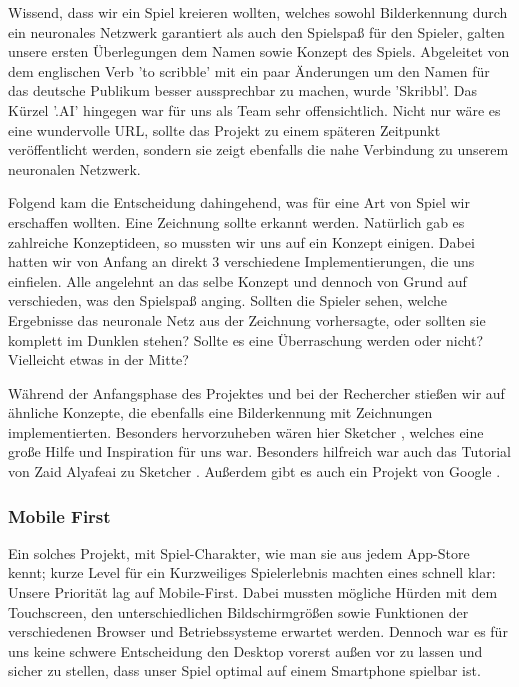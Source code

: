 \documentclass[11pt]{article}
\begin{document}
Wissend, dass wir ein Spiel kreieren wollten, welches sowohl Bilderkennung durch ein neuronales Netzwerk garantiert als auch den Spielspaß für den Spieler, galten unsere ersten Überlegungen dem Namen sowie Konzept des Spiels.
Abgeleitet von dem englischen Verb 'to scribble' mit ein paar Änderungen um den Namen für das deutsche Publikum besser aussprechbar zu machen, wurde 'Skribbl'. Das Kürzel '.AI' hingegen war für uns als Team sehr offensichtlich. Nicht nur wäre es eine wundervolle URL, sollte das Projekt zu einem späteren Zeitpunkt veröffentlicht werden, sondern sie zeigt ebenfalls die nahe Verbindung zu unserem neuronalen Netzwerk.

Folgend kam die Entscheidung dahingehend, was für eine Art von Spiel wir erschaffen wollten. Eine Zeichnung sollte erkannt werden. Natürlich gab es zahlreiche Konzeptideen, so mussten wir uns auf ein Konzept einigen. Dabei hatten wir von Anfang an direkt 3 verschiedene Implementierungen, die uns einfielen. Alle angelehnt an das selbe Konzept und dennoch von Grund auf verschieden, was den Spielspaß anging. Sollten die Spieler sehen, welche Ergebnisse das neuronale Netz aus der Zeichnung vorhersagte, oder sollten sie komplett im Dunklen stehen? Sollte es eine Überraschung werden oder nicht? Vielleicht etwas in der Mitte?

Während der Anfangsphase des Projektes und bei der Rechercher stießen wir auf ähnliche Konzepte, die ebenfalls eine Bilderkennung mit Zeichnungen implementierten. Besonders hervorzuheben wären hier Sketcher \parencite{sketcher}, welches eine große Hilfe und Inspiration für uns war. Besonders hilfreich war auch das Tutorial von Zaid Alyafeai zu Sketcher \parencite{sketcherTutorial}. Außerdem gibt es auch ein Projekt von Google \parencite{quickDraw}.

\subsubsection{Mobile First}

Ein solches Projekt, mit Spiel-Charakter, wie man sie aus jedem App-Store kennt; kurze Level für ein Kurzweiliges Spielerlebnis machten eines schnell klar: Unsere Priorität lag auf Mobile-First.
Dabei mussten mögliche Hürden mit dem Touchscreen, den unterschiedlichen Bildschirmgrößen sowie Funktionen der verschiedenen Browser und Betriebssysteme erwartet werden. Dennoch war es für uns keine schwere Entscheidung den Desktop vorerst außen vor zu lassen und sicher zu stellen, dass unser Spiel optimal auf einem Smartphone spielbar ist.
\end{document}
